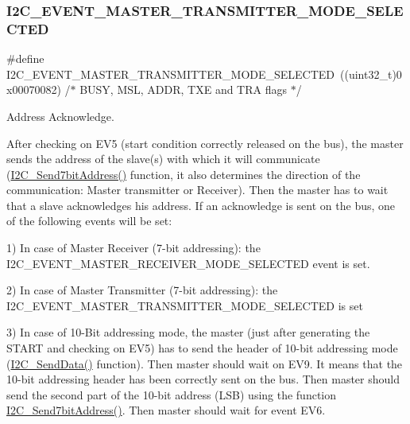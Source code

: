 \subsubsection{\texorpdfstring{I2\+C\+\_\+\+E\+V\+E\+N\+T\+\_\+\+M\+A\+S\+T\+E\+R\+\_\+\+T\+R\+A\+N\+S\+M\+I\+T\+T\+E\+R\+\_\+\+M\+O\+D\+E\+\_\+\+S\+E\+L\+E\+C\+T\+ED}{I2C\_EVENT\_MASTER\_TRANSMITTER\_MODE\_SELECTED}}
{\footnotesize\ttfamily \#define I2\+C\+\_\+\+E\+V\+E\+N\+T\+\_\+\+M\+A\+S\+T\+E\+R\+\_\+\+T\+R\+A\+N\+S\+M\+I\+T\+T\+E\+R\+\_\+\+M\+O\+D\+E\+\_\+\+S\+E\+L\+E\+C\+T\+ED~((uint32\+\_\+t)0x00070082)  /$\ast$ B\+U\+S\+Y, M\+S\+L, A\+D\+D\+R, T\+X\+E and T\+R\+A flags $\ast$/}



Address Acknowledge. 

After checking on E\+V5 (start condition correctly released on the bus), the master sends the address of the slave(s) with which it will communicate (\mbox{\hyperlink{group___i2_c_ga009fc2a5b2313c36da39ece39a1156a6}{I2\+C\+\_\+\+Send7bit\+Address()}} function, it also determines the direction of the communication\+: Master transmitter or Receiver). Then the master has to wait that a slave acknowledges his address. If an acknowledge is sent on the bus, one of the following events will be set\+:

1) In case of Master Receiver (7-\/bit addressing)\+: the I2\+C\+\_\+\+E\+V\+E\+N\+T\+\_\+\+M\+A\+S\+T\+E\+R\+\_\+\+R\+E\+C\+E\+I\+V\+E\+R\+\_\+\+M\+O\+D\+E\+\_\+\+S\+E\+L\+E\+C\+T\+ED event is set.

2) In case of Master Transmitter (7-\/bit addressing)\+: the I2\+C\+\_\+\+E\+V\+E\+N\+T\+\_\+\+M\+A\+S\+T\+E\+R\+\_\+\+T\+R\+A\+N\+S\+M\+I\+T\+T\+E\+R\+\_\+\+M\+O\+D\+E\+\_\+\+S\+E\+L\+E\+C\+T\+ED is set

3) In case of 10-\/\+Bit addressing mode, the master (just after generating the S\+T\+A\+RT and checking on E\+V5) has to send the header of 10-\/bit addressing mode (\mbox{\hyperlink{group___i2_c_ga7bd9e70b8eafde0dd5eb42b0d95fe1a9}{I2\+C\+\_\+\+Send\+Data()}} function). Then master should wait on E\+V9. It means that the 10-\/bit addressing header has been correctly sent on the bus. Then master should send the second part of the 10-\/bit address (L\+SB) using the function \mbox{\hyperlink{group___i2_c_ga009fc2a5b2313c36da39ece39a1156a6}{I2\+C\+\_\+\+Send7bit\+Address()}}. Then master should wait for event E\+V6. \mbox{\label{group___i2_c___events_ga8b244626839940569c6c8bbfc4efe21d}} 
